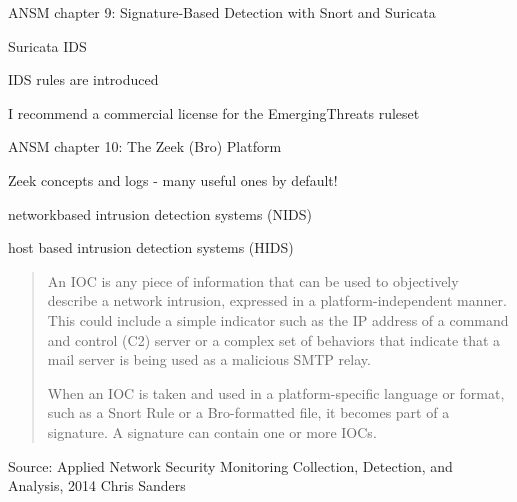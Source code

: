 \documentclass[Screen16to9,17pt]{foils}
\begin{document}


\begin{list1}
\item ANSM chapter 9: Signature-Based Detection with Snort and Suricata
\begin{list2}
\item Suricata IDS
\item IDS rules are introduced
\item I recommend a commercial license for the EmergingThreats ruleset
\end{list2}
\end{list1}



\begin{list1}
\item ANSM chapter 10: The Zeek (Bro) Platform
\begin{list2}
\item Zeek concepts and logs - many useful ones by default!
\end{list2}
\end{list1}



\begin{list2}
\item networkbased intrusion detection systems (NIDS)
\item host based intrusion detection systems (HIDS)
\end{list2}


\begin{quote}
An IOC is any piece of information that can be used to objectively describe a
network intrusion, expressed in a platform-independent manner. This could include a simple indicator such as the IP address of a command and control (C2) server or a complex set of behaviors that indicate that a mail server is being used as a malicious SMTP relay.

When an IOC is taken and used in a platform-specific language or format, such as a Snort Rule or a Bro-formatted file, it becomes part of a signature. A signature can contain one or more IOCs.
\end{quote}

Source: Applied Network Security Monitoring Collection, Detection, and Analysis, 2014 Chris Sanders
\end{document}
